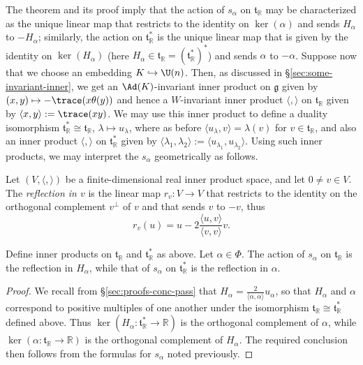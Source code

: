\documentclass[reqno]{amsart} 
\begin{document}
The theorem and its proof imply that the action of $s_\alpha$ on $\mathfrak{t}_{\mathbb{R}}$ may be characterized as the unique linear map that restricts to the identity on $\ker(\alpha)$ and sends $H_\alpha$ to $- H_\alpha$; similarly, the action on $\mathfrak{t}_{\mathbb{R}}^*$ is the unique linear map that is given by the identity on $\ker(H_\alpha)$ (here $H_\alpha \in \mathfrak{t}_{\mathbb{R}} = (\mathfrak{t}_{\mathbb{R}}^*)^*$) and sends $\alpha$ to $-\alpha$.  Suppose now that we choose an embedding $K \hookrightarrow \U(n)$.  Then, as discussed in \S\ref{sec:some-invariant-inner}, we get an $\Ad(K)$-invariant inner product on $\mathfrak{g}$ given by $(x,y) \mapsto - \trace(x \theta(y))$ and hence a $W$-invariant inner product $\langle , \rangle$ on $\mathfrak{t}_{\mathbb{R}}$ given by $\langle x, y \rangle := \trace(x y)$.  We may use this inner product to define a duality isomorphism $\mathfrak{t}_{\mathbb{R}}^* \cong \mathfrak{t}_{\mathbb{R}}$, $\lambda \mapsto u_\lambda$, where as before $\langle u_\lambda, v \rangle = \lambda(v)$ for $v \in \mathfrak{t}_{\mathbb{R}}$, and also an inner product $\langle , \rangle$ on $\mathfrak{t}_{\mathbb{R}}^*$ given by $\langle \lambda_1, \lambda_2 \rangle := \langle u_{\lambda_1}, u_{\lambda_{2}} \rangle$.  Using such inner products, we may interpret the $s_\alpha$ geometrically as follows.
\begin{definition}
  Let $(V, \langle , \rangle)$ be a finite-dimensional real inner product space, and let $0 \neq v \in V$.  The \emph{reflection in $v$} is the linear map $r_v : V \rightarrow V$ that restricts to the identity on the orthogonal complement $v^\perp$ of $v$ and that sends $v$ to $-v$, thus
  \begin{equation*}
    r_v(u) = u - 2 \frac{\langle u, v \rangle}{\langle v, v \rangle} v.
  \end{equation*}
\end{definition}
\begin{lemma}
  Define inner products on $\mathfrak{t}_{\mathbb{R}}$ and $\mathfrak{t}_{\mathbb{R}}^*$ as above.  Let $\alpha \in \Phi$.  The action of $s_\alpha$ on $\mathfrak{t}_{\mathbb{R}}$ is the reflection in $H_\alpha$, while that of $s_\alpha$ on $\mathfrak{t}_{\mathbb{R}}^*$ is the reflection in $\alpha$.
\end{lemma}
\begin{proof}
  We recall from \S\ref{sec:proofs-conc-pass} that $H_\alpha = \frac{2}{\langle \alpha, \alpha \rangle} u_\alpha$, so that $H_\alpha$ and $\alpha$ correspond to positive multiples of one another under the isomorphism $\mathfrak{t}_{\mathbb{R}} \cong \mathfrak{t}_{\mathbb{R}}^*$ defined above.  Thus $\ker(H_\alpha : \mathfrak{t}_{\mathbb{R}}^* \rightarrow \mathbb{R})$ is the orthogonal complement of $\alpha$, while $\ker(\alpha : \mathfrak{t}_{\mathbb{R}} \rightarrow \mathbb{R})$ is the orthogonal complement of $H_\alpha$.  The required conclusion then follows from the formulas for $s_\alpha$ noted previously.
\end{proof}
\end{document}
